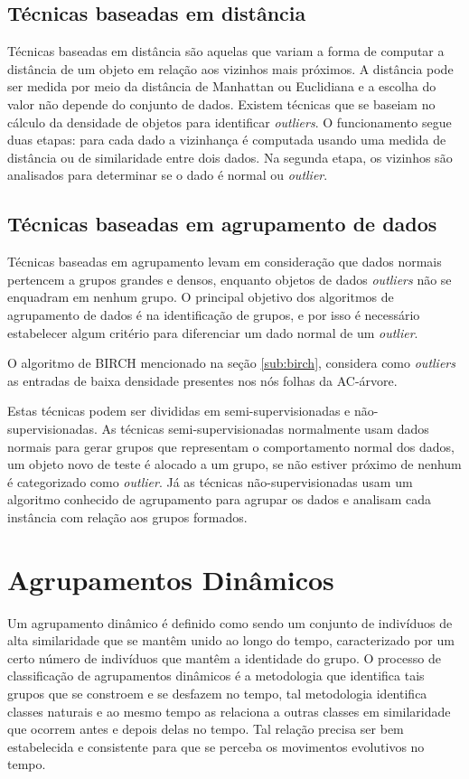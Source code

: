 \subsection{Técnicas baseadas em distância}
Técnicas baseadas em distância são aquelas que variam a forma de computar a distância de um objeto em relação aos vizinhos mais próximos. A distância pode ser medida por meio da distância de Manhattan ou Euclidiana e a escolha do valor não depende do conjunto de dados. Existem técnicas que se baseiam no cálculo da densidade de objetos para identificar \textit{outliers}. O funcionamento segue duas etapas: para cada dado a vizinhança é computada usando uma medida de distância ou de similaridade entre dois dados. Na segunda etapa, os vizinhos são analisados para determinar se o dado é normal ou \textit{outlier}.

\subsection{Técnicas baseadas em agrupamento de dados}
Técnicas baseadas em agrupamento levam em consideração que dados normais pertencem a grupos grandes e densos, enquanto objetos de dados \textit{outliers} não se enquadram em nenhum grupo. O principal objetivo dos algoritmos de agrupamento de dados é na identificação de grupos, e por isso é necessário estabelecer algum critério para diferenciar um dado normal de um \textit{outlier}.

O algoritmo de \acrshort{BIRCH} \cite{Zhang1996} mencionado na seção \ref{sub:birch}, considera como \textit{outliers} as entradas de baixa densidade presentes nos nós folhas da AC-árvore.

Estas técnicas podem ser divididas em semi-supervisionadas e não-supervisionadas. As técnicas semi-supervisionadas normalmente usam dados normais para gerar grupos que representam o comportamento normal dos dados, um objeto novo de teste é alocado a um grupo, se não estiver próximo de nenhum é categorizado como \textit{outlier}. Já as técnicas não-supervisionadas usam um algoritmo conhecido de agrupamento para agrupar os dados e analisam cada instância com relação aos grupos formados.

\section{Agrupamentos Dinâmicos}
Um agrupamento dinâmico é definido como sendo um conjunto de indivíduos de alta similaridade que se mantêm unido ao longo do tempo, caracterizado por um certo número de indivíduos que mantêm a identidade do grupo. O processo de classificação de agrupamentos dinâmicos é a metodologia que identifica tais grupos que se constroem e se desfazem no tempo, tal metodologia identifica classes naturais e ao mesmo tempo as relaciona a outras classes em similaridade que ocorrem antes e depois delas no tempo. Tal relação precisa ser bem estabelecida e consistente para que se perceba os movimentos evolutivos no tempo.

